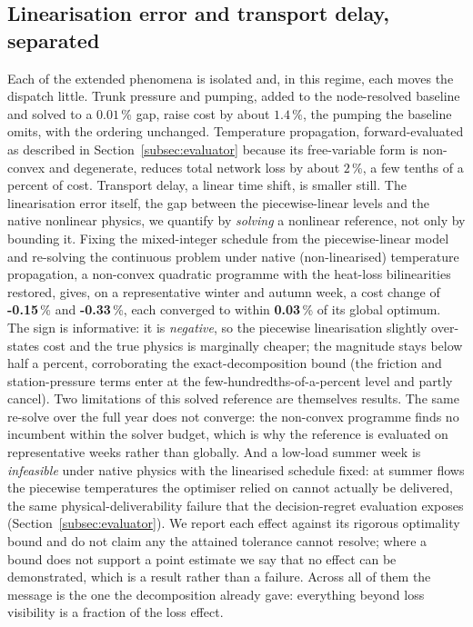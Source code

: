 \documentclass[a4paper,fleqn]{cas-sc}
\begin{document}
\subsection{Linearisation error and transport delay, separated}
\label{subsec:linearisation}
Each of the extended phenomena is isolated and, in this regime, each moves the dispatch little.
Trunk pressure and pumping, added to the node-resolved baseline and solved to a $0.01$\,\%
gap, raise cost by about $1.4$\,\%, the pumping the baseline omits, with the ordering
unchanged. Temperature propagation, forward-evaluated as described in Section~\ref{subsec:evaluator}
because its free-variable form is non-convex and degenerate, reduces total network loss by about
$2$\,\%, a few tenths of a percent of cost. Transport delay, a linear time shift, is smaller
still. The linearisation error itself, the gap between the piecewise-linear levels and the
native nonlinear physics, we quantify by \emph{solving} a nonlinear reference, not only by
bounding it. Fixing the mixed-integer schedule from the piecewise-linear model and re-solving the
continuous problem under native (non-linearised) temperature propagation, a non-convex quadratic
programme with the heat-loss bilinearities restored, gives, on a representative winter and autumn
week, a cost change of \textbf{-0.15}\,\% and \textbf{-0.33}\,\%,
each converged to within \textbf{0.03}\,\% of its global optimum. The sign is
informative: it is \emph{negative}, so the piecewise linearisation slightly over-states cost and
the true physics is marginally cheaper; the magnitude stays below half a percent, corroborating
the exact-decomposition bound (the friction and station-pressure terms enter at the
few-hundredths-of-a-percent level and partly cancel). Two limitations of this solved reference are
themselves results. The same re-solve over the full year does not converge: the non-convex
programme finds no incumbent within the solver budget, which is why the reference is evaluated on
representative weeks rather than globally. And a low-load summer week is \emph{infeasible} under
native physics with the linearised schedule fixed: at summer flows the piecewise temperatures the
optimiser relied on cannot actually be delivered, the same physical-deliverability failure that the
decision-regret evaluation exposes (Section~\ref{subsec:evaluator}). We report each effect against
its rigorous optimality bound and do not claim any the attained tolerance cannot resolve; where a
bound does not support a point estimate we say that no effect can be demonstrated, which is a
result rather than a failure. Across all of them the message is the one the decomposition
already gave: everything beyond loss visibility is a fraction of the loss effect.

\end{document}
